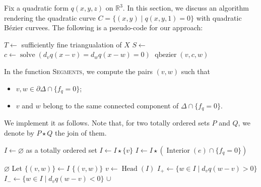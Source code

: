 \documentclass[pdftex,a4paper,12pt]{scrartcl}
\theoremstyle{plain}
\theoremstyle{definition}
\theoremstyle{remark}
\begin{document}
Fix a quadratic form $q(x,y,z)$ on $\mathbb R^3$.
In this section, we discuss an algorithm rendering the quadratic curve $C=\{(x,y)\mid q(x,y,1)=0\}$ with quadratic B\'ezier curvees.
The following is a pseudo-code for our approach:
\begin{algorithmic}[1]
\State $T\gets$ sufficiently fine triangualation of $X$
\State $S\gets$ 
\State $c\gets \operatorname{solve}(d_vq(x-v)=d_wq(x-w)=0)$
\State $\operatorname{qbezier}(v,c,w)$
\EndFor
\EndFor
\EndProcedure
\end{algorithmic}
In the function \textsc{Segments}, we compute the pairs $(v,w)$ such that
\begin{itemize}
  \item $v,w\in\partial\Delta\cap\{f_q=0\}$;
  \item $v$ and $w$ belong to the same connected component of $\Delta\cap\{f_q=0\}$.
\end{itemize}
We implement it as follows.
Note that, for two totally ordered sets $P$ and $Q$, we denote by $P\star Q$ the join of them.
\begin{algorithmic}[1]
\State $I\gets\varnothing$ as a totally ordered set
\State $I\gets I\star\{v\}$
\EndIf
\EndFor
{}
\State $I\gets I\star(\operatorname{Interior}(e)\cap \{f_q=0\})$
\EndFor
\State \Return {}
\EndProcedure

\State \Return $\varnothing$
\State Let $\{(v,w)\}\gets I$
\State \Return $\{(v,w)\}$
\EndIf
\State $v\gets\operatorname{Head}(I)$
\State $I_+\gets \{w\in I\mid d_vq(w-v)>0\}$
\State $I_-\gets \{w\in I\mid d_vq(w-v)<0\}$
\State \Return {} $\cup$ 
\EndProcedure
\end{algorithmic}
\end{document}
